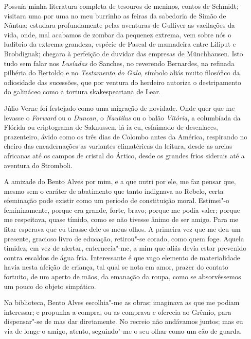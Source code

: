 Possuía minha literatura completa de tesouros de meninos, contos de
Schmidt; visitara uma por uma no meu burrinho as feiras da sabedoria de
Simão de Nântua; estudara profundamente pelas aventuras de Gulliver as
vacilações da vida, onde, mal acabamos de zombar da pequenez extrema,
vem sobre nós o ludíbrio da extrema grandeza, espécie de Pascal de
mamadeira entre Liliput e Brobdignak; chegara à perfeição de duvidar
das empresas de Münchhausen. Isto tudo sem falar nos \textit{Lusíadas} do
Sanches, no reverendo Bernardes, na refinada pilhéria do Bertoldo e no
\textit{Testamento do Galo}, símbolo aliás muito filosófico da odiosidade das
sucessões, que por ventura do herdeiro autoriza o destripamento do
galináceo como a tortura skakespeariana de Lear. 

Júlio Verne foi
festejado como uma migração de novidade. Onde quer que me levasse o
\textit{Forward} ou o \textit{Duncan}, o \textit{Nautilus} ou o balão \textit{Vitória}, a columbíada da
Flórida ou criptograma de Saknussen, lá ia eu, esfaimado de desenlaces,
prazenteiro, ávido como os três dias de Colombo antes da América,
respirando no cheiro das encadernações as variantes climatéricas da
leitura, desde as areias africanas até os campos de cristal do Ártico,
desde os grandes frios siderais até a aventura do Stromboli. 

A amizade
do Bento Alves por mim, e a que nutri por ele, me faz pensar que, mesmo
sem o caráter de abatimento que tanto indignava ao Rebelo, certa
efeminação pode existir como um período de constituição moral.
Estimei"-o femininamente, porque era grande, forte, bravo; porque me
podia valer; porque me respeitava, quase tímido, como se não tivesse
ânimo de ser amigo. Para me fitar esperava que eu tirasse dele os meus
olhos. A primeira vez que me deu um presente, gracioso livro de
educação, retirou"-se corado, como quem foge. Aquela timidez, em vez
de alertar, enternecia"-me, a mim que aliás devia estar prevenido
contra escaldos de água fria. Interessante é que vago elemento de
materialidade havia nesta afeição de criança, tal qual se nota em amor,
prazer do contato fortuito, de um aperto de mãos, da emanação da roupa,
como se absorvêssemos um pouco do objeto simpático. 

Na biblioteca,
Bento Alves escolhia"-me as obras; imaginava as que me podiam
interessar; e propunha a compra, ou as comprava e oferecia ao Grêmio,
para dispensar"-se de mas dar diretamente. No recreio não andávamos
juntos; mas eu via de longe o amigo, atento, seguindo"-me o seu olhar
como um cão de guarda. 

